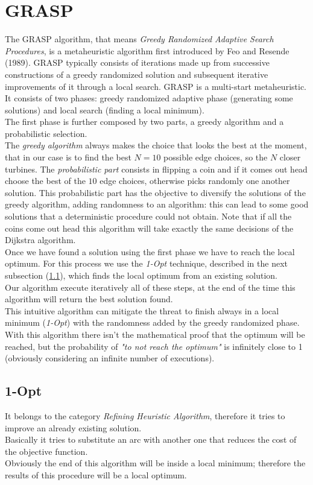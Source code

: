 \section{GRASP}
The GRASP algorithm, that means \textit{Greedy Randomized Adaptive Search Procedures}, is a metaheuristic algorithm first introduced by Feo and Resende (1989). GRASP typically consists of iterations made up from successive constructions of a greedy randomized solution and subsequent iterative improvements of it through a local search. GRASP is a multi-start metaheuristic. \\
It consists of two phases: greedy randomized adaptive phase (generating some solutions) and local search (finding a local minimum).\\
The first phase is further composed by two parts, a greedy algorithm and a probabilistic selection.\\
The \textit{greedy algorithm} always makes the choice that looks the best at the moment, that in our case is to find the best $N = 10$ possible edge choices, so the $N$ closer turbines. The \textit{probabilistic part} consists in flipping a coin and if it comes out head choose the best of the $10$ edge choices, otherwise picks randomly one another solution. This probabilistic part has the objective to diversify the solutions of the greedy algorithm, adding randomness to an algorithm: this can lead to some good solutions that a deterministic procedure could not obtain. Note that if all the coins come out head this algorithm will take exactly the same decisions of the Dijkstra algorithm.\\
Once we have found a solution using the first phase we have to reach the local optimum. For this process we use the \textit{1-Opt} technique, described in the next subsection (\ref{subsec:1opt}), which finds the local optimum from an existing solution.\\
Our algorithm execute iteratively all of these steps, at the end of the time this algorithm will return the best solution found. \\
This intuitive algorithm can mitigate the threat to finish always in a local minimum (\textit{1-Opt}) with the randomness added by the greedy randomized phase.\\ 
With this algorithm there isn't the mathematical proof that the optimum will be reached, but the probability of \textit{"to not reach the optimum"} is infinitely close to 1 (obviously considering an infinite number of executions). 
\subsection{1-Opt} \label{subsec:1opt}
It belongs to the category \textit{Refining Heuristic Algorithm}, therefore it tries to                                                                  improve an already existing solution.\\                                                         
Basically it tries to substitute an arc with another one that reduces the cost of the objective function. \\
Obviously the end of this algorithm will be inside a local minimum; therefore the results of this procedure will be a local optimum. 

